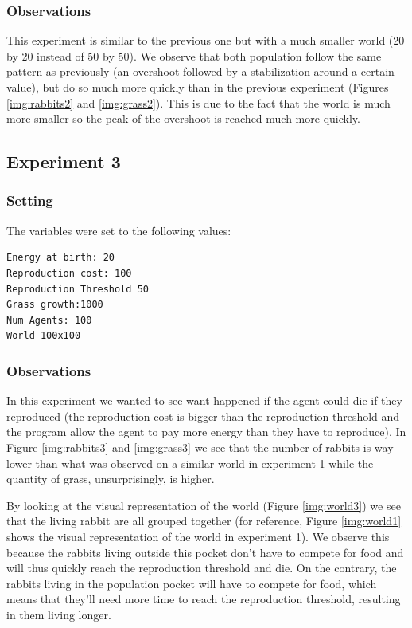 \documentclass[11pt]{article}
\begin{document}
\subsubsection{Observations}
This experiment is similar to the previous one but with a much smaller world (20 by 20 instead of 50 by 50). We observe that both population follow the same pattern as previously (an overshoot followed by a stabilization around a certain value), but do so much more quickly than in the previous experiment (Figures \ref{img:rabbits2} and \ref{img:grass2}). This is due to the fact that the world is much more smaller so the peak of the overshoot is reached much more quickly.

\subsection{Experiment 3}
\label{sec:experiment3}

\subsubsection{Setting}
The variables were set to the following values:
\begin{lstlisting}
Energy at birth: 20
Reproduction cost: 100
Reproduction Threshold 50
Grass growth:1000
Num Agents: 100
World 100x100
\end{lstlisting}
\subsubsection{Observations}
In this experiment we wanted to see want happened if the agent could die if they reproduced (the reproduction cost is bigger than the reproduction threshold and the program allow the agent to pay more energy than they have to reproduce). In Figure \ref{img:rabbits3} and \ref{img:grass3} we see that the number of rabbits is way lower than what was observed on a similar world in experiment 1 while the quantity of grass, unsurprisingly, is higher.

By looking at the visual representation of the world (Figure \ref{img:world3}) we see that the living rabbit are all grouped together (for reference, Figure \ref{img:world1} shows the visual representation of the world in experiment 1). We observe this because the rabbits living outside this pocket don't have to compete for food and will thus quickly reach the reproduction threshold and die. On the contrary, the rabbits living in the population pocket will have to compete for food, which means that they'll need more time to reach the reproduction threshold, resulting in them living longer.
\end{document}
